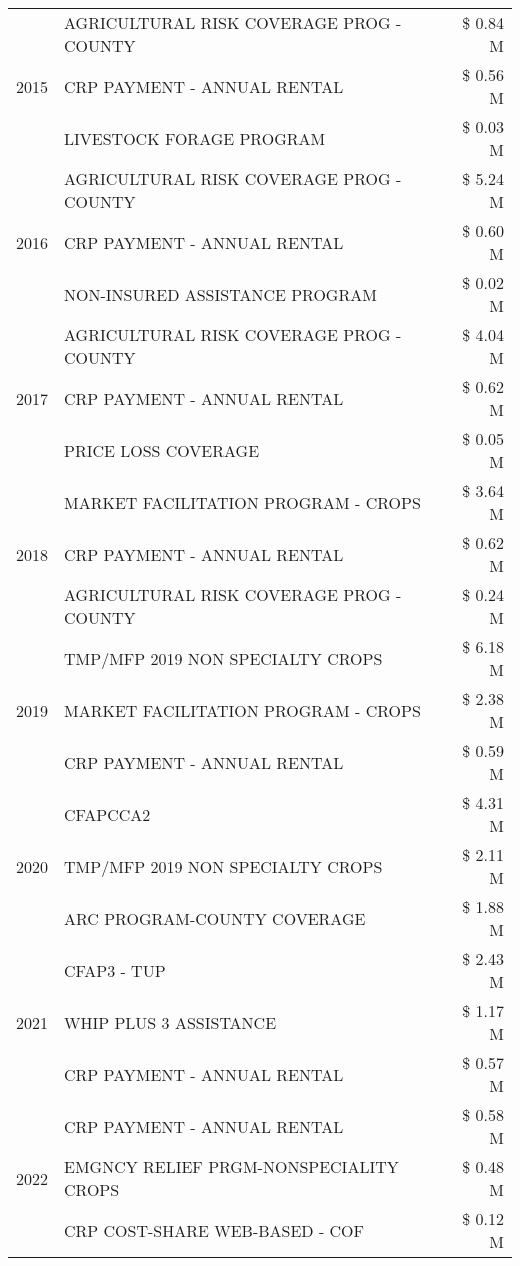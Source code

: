 \begin{tabular}{llr}
\cline{1-3}
\multirow[t]{3}{*}{2015} & AGRICULTURAL RISK COVERAGE PROG - COUNTY & \$ 0.84 M \\
 & CRP PAYMENT - ANNUAL RENTAL & \$ 0.56 M \\
 & LIVESTOCK FORAGE PROGRAM & \$ 0.03 M \\
\cline{1-3}
\multirow[t]{3}{*}{2016} & AGRICULTURAL RISK COVERAGE PROG - COUNTY & \$ 5.24 M \\
 & CRP PAYMENT - ANNUAL RENTAL & \$ 0.60 M \\
 & NON-INSURED ASSISTANCE PROGRAM & \$ 0.02 M \\
\cline{1-3}
\multirow[t]{3}{*}{2017} & AGRICULTURAL RISK COVERAGE PROG - COUNTY & \$ 4.04 M \\
 & CRP PAYMENT - ANNUAL RENTAL & \$ 0.62 M \\
 & PRICE LOSS COVERAGE & \$ 0.05 M \\
\cline{1-3}
\multirow[t]{3}{*}{2018} & MARKET FACILITATION PROGRAM - CROPS & \$ 3.64 M \\
 & CRP PAYMENT - ANNUAL RENTAL & \$ 0.62 M \\
 & AGRICULTURAL RISK COVERAGE PROG - COUNTY & \$ 0.24 M \\
\cline{1-3}
\multirow[t]{3}{*}{2019} & TMP/MFP 2019 NON SPECIALTY CROPS & \$ 6.18 M \\
 & MARKET FACILITATION PROGRAM - CROPS & \$ 2.38 M \\
 & CRP PAYMENT - ANNUAL RENTAL & \$ 0.59 M \\
\cline{1-3}
\multirow[t]{3}{*}{2020} & CFAPCCA2 & \$ 4.31 M \\
 & TMP/MFP 2019 NON SPECIALTY CROPS & \$ 2.11 M \\
 & ARC PROGRAM-COUNTY COVERAGE & \$ 1.88 M \\
\cline{1-3}
\multirow[t]{3}{*}{2021} & CFAP3 - TUP & \$ 2.43 M \\
 & WHIP PLUS 3 ASSISTANCE & \$ 1.17 M \\
 & CRP PAYMENT - ANNUAL RENTAL & \$ 0.57 M \\
\cline{1-3}
\multirow[t]{3}{*}{2022} & CRP PAYMENT - ANNUAL RENTAL & \$ 0.58 M \\
 & EMGNCY RELIEF PRGM-NONSPECIALITY CROPS & \$ 0.48 M \\
 & CRP COST-SHARE WEB-BASED - COF & \$ 0.12 M \\
\cline{1-3}
\bottomrule
\end{tabular}
